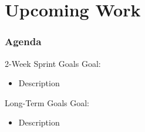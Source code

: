 \documentclass[aspectratio=1610, xcolor=dvipsnames]{packages/beamer}
\newcommand{\displayTOC}{\begin{frame}\frametitle{Agenda} \tableofcontents[currentsection, subsectionstyle=show/show/hide]\end{frame}}
\begin{document}
\section{Upcoming Work} \displayTOC
\begin{frame}{2-Week Sprint Goals}
    Goal: \begin{itemize}
        \item Description
    \end{itemize}
\end{frame}


\begin{frame}{Long-Term Goals}
    Goal: \begin{itemize}
        \item Description
    \end{itemize}
\end{frame}

\end{document}
